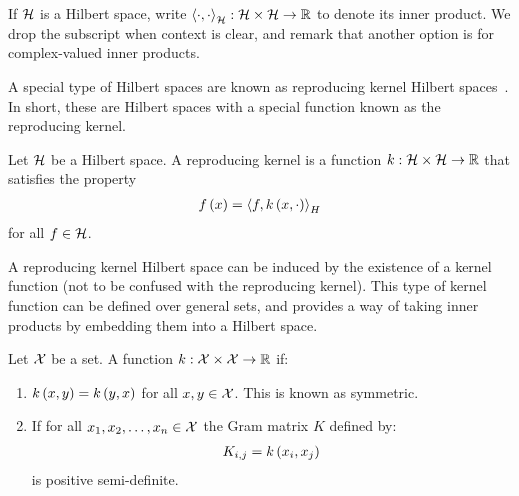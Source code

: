 \documentclass[12pt]{article}
\begin{document}
If \(\mathcal{H}\) is a Hilbert space,
write
\(\left\langle\cdot, \cdot\right\rangle_{\mathcal{H}} : \mathcal{H} \times \mathcal{H} \to \mathbb{R}\)
to denote its inner product.
We drop the subscript when context is clear,
and remark that another option is for complex-valued inner products.

A special type of Hilbert spaces are known as
reproducing kernel Hilbert spaces~\cite{berlinet2011reproducing}.
In short,
these are Hilbert spaces with a special function known
as the reproducing kernel.


\begin{definition}
  Let \(\mathcal{H}\) be a Hilbert space.
  A reproducing kernel is a function
  \(k : \mathcal{H} \times \mathcal{H} \to \mathbb{R}\)
  that satisfies the property
  \begin{align*}
    f\left(x\right) = \left\langle f, k\left(x, \cdot\right)\right\rangle_H
  \end{align*}
  for all \(f \in \mathcal{H}\).
\end{definition}

A reproducing kernel Hilbert space can be induced by the existence
of a kernel function (not to be confused with the reproducing kernel).
This type of kernel function can be defined over general sets,
and provides a way of taking inner products by embedding them
into a Hilbert space.

\begin{definition}[Kernel]
  Let \(\mathcal{X}\) be a set.
  A function \(k : \mathcal{X} \times \mathcal{X} \to \mathbb{R}\) if:

  \begin{enumerate}
    \item
      \(k\left(x, y\right) = k\left(y, x\right)\) for all \(x, y \in \mathcal{X}\).
      This is known as symmetric.

    \item
      If for all \(x_1, x_2, \ldots, x_n \in \mathcal{X}\)
      the Gram matrix \(K\)
      defined by:
      \begin{align*}
        K_{i, j} = k\left(x_i, x_j\right)
      \end{align*}
      is positive semi-definite.

  \end{enumerate}

\end{definition}
\end{document}
